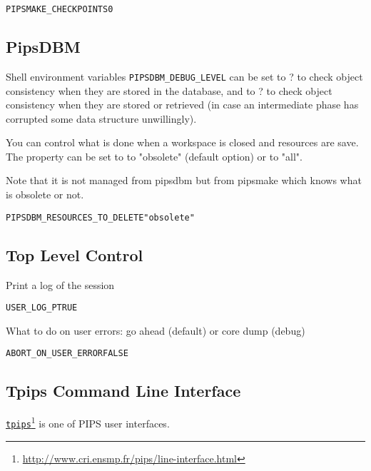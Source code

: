 \documentclass[a4paper]{report}
\newenvironment{PipsProp}{\begin{alltt}}{\end{alltt}}
\newcommand{\LINK}[2]{\href{#2}{#1}\footnote{\url{#2}}\xspace}
\newcommand{\TPIPS}{\LINK{\texttt{tpips}}{http://www.cri.ensmp.fr/pips/line-interface.html}}
\begin{document}
\begin{PipsProp}
PIPSMAKE_CHECKPOINTS 0
\end{PipsProp}

\subsection{PipsDBM}

Shell environment variables \verb+PIPSDBM_DEBUG_LEVEL+ can be set to ?
to check object consistency when they are stored in the database, and to
? to check object consistency when they are stored or retrieved (in case
an intermediate phase has corrupted some data structure unwillingly).

You can control what is done when a workspace is closed and resources are
save. The property can be set to to "obsolete" (default option) or to "all".

Note that it is not managed from pipsdbm but from pipsmake which knows
what is obsolete or not.

\begin{PipsProp}
PIPSDBM_RESOURCES_TO_DELETE "obsolete"
\end{PipsProp}

\subsection{Top Level Control}

Print a log of the session

\begin{PipsProp}
USER_LOG_P      TRUE
\end{PipsProp}

What to do on user errors: go ahead (default) or core dump (debug)

\begin{PipsProp}
ABORT_ON_USER_ERROR     FALSE
\end{PipsProp}

\subsection{Tpips Command Line Interface}

\TPIPS{} is one of PIPS user interfaces.
\end{document}
